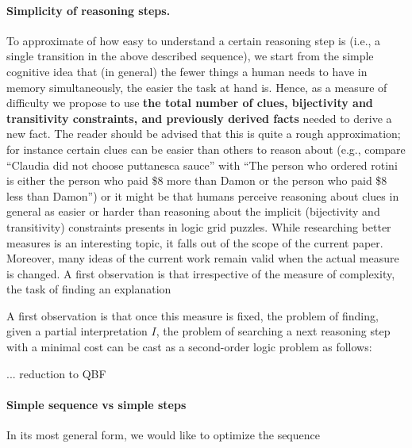 \paragraph{Simplicity of reasoning steps.}
To approximate of how easy to understand a certain reasoning step is (i.e., a single transition in the above described sequence), we start from the simple cognitive idea  that (in general) the fewer things a human needs to have in memory simultaneously, the easier the task at hand is. 
Hence, as a measure of difficulty we propose to use \textbf{the total number of clues, bijectivity and transitivity constraints, and previously derived facts} needed to derive a new fact. 
The reader should be advised that this is quite a rough approximation; for instance certain clues can be easier than others to reason about (e.g., compare ``Claudia did not choose puttanesca sauce'' with ``The person who ordered rotini is either the person who paid \$8 more than Damon or the person who paid \$8 less than Damon'') or it might be that humans perceive reasoning about clues in general as easier or harder than reasoning about the implicit (bijectivity and transitivity) constraints presents in logic grid puzzles. While researching better measures is an interesting topic, it falls out of the scope of the current paper. Moreover, many ideas of the current work remain valid when the actual measure is changed. 
A first observation is that irrespective of the measure of complexity, the task of finding an explanation  


A first observation is that once this measure is fixed, the problem of finding, given a partial interpretation $I$, the problem of searching a next reasoning step with a minimal cost can be cast as a second-order logic problem as follows: 



... reduction to QBF \cite{kr/BogaertsTS16,kr/vanderHallenJ18}



\paragraph{Simple sequence vs simple steps}
In its most general form, we would like to optimize the sequence  





